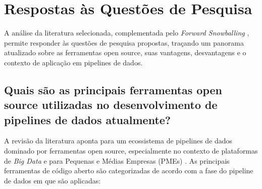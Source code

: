 \section{Respostas às Questões de Pesquisa}

A análise da literatura selecionada, complementada pelo \textit{Forward Snowballing} \cite[]{felizardo2016using}, permite responder às questões de pesquisa propostas, traçando um panorama atualizado sobre as ferramentas open source, suas vantagens, desvantagens e o contexto de aplicação em pipelines de dados.
\subsection{Quais são as principais ferramentas open source utilizadas no desenvolvimento de pipelines de dados atualmente?}
\label{sec:respostas:ferramentas}

A revisão da literatura aponta para um ecossistema de pipelines de dados dominado por ferramentas open source, especialmente no contexto de plataformas de \textit{Big Data} e para Pequenas e Médias Empresas (PMEs) \cite[]{septian2019, murarka2024, mbata2024survey}. As principais ferramentas de código aberto são categorizadas de acordo com a fase do pipeline de dados em que são aplicadas:

